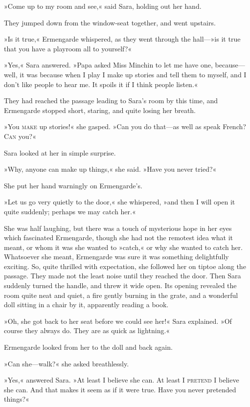 »Come up to my room and see,« said Sara, holding out her hand.

They jumped down from the window-seat together, and went upstairs.

»Is it true,« Ermengarde whispered, as they went through the hall—»is it true that you have a playroom all to yourself?«

»Yes,« Sara answered. »Papa asked Miss Minchin to let me have one, because—well, it was because when I play I make up stories and tell them to myself, and I don't like people to hear me. It spoils it if I think people listen.«

They had reached the passage leading to Sara's room by this time, and Ermengarde stopped short, staring, and quite losing her breath.

»You \textsc{make} up stories!« she gasped. »Can you do that—as well as speak French? \textsc{Can} you?«

Sara looked at her in simple surprise.

»Why, anyone can make up things,« she said. »Have you never tried?«

She put her hand warningly on Ermengarde's.

»Let us go very quietly to the door,« she whispered, »and then I will open it quite suddenly; perhaps we may catch her.«

She was half laughing, but there was a touch of mysterious hope in her eyes which fascinated Ermengarde, though she had not the remotest idea what it meant, or whom it was she wanted to »catch,« or why she wanted to catch her. Whatsoever she meant, Ermengarde was sure it was something delightfully exciting. So, quite thrilled with expectation, she followed her on tiptoe along the passage. They made not the least noise until they reached the door. Then Sara suddenly turned the handle, and threw it wide open. Its opening revealed the room quite neat and quiet, a fire gently burning in the grate, and a wonderful doll sitting in a chair by it, apparently reading a book.

»Oh, she got back to her seat before we could see her!« Sara explained. »Of course they always do. They are as quick as lightning.«

Ermengarde looked from her to the doll and back again.

»Can she—walk?« she asked breathlessly.

»Yes,« answered Sara. »At least I believe she can. At least I \textsc{pretend} I believe she can. And that makes it seem as if it were true. Have you never pretended things?«

